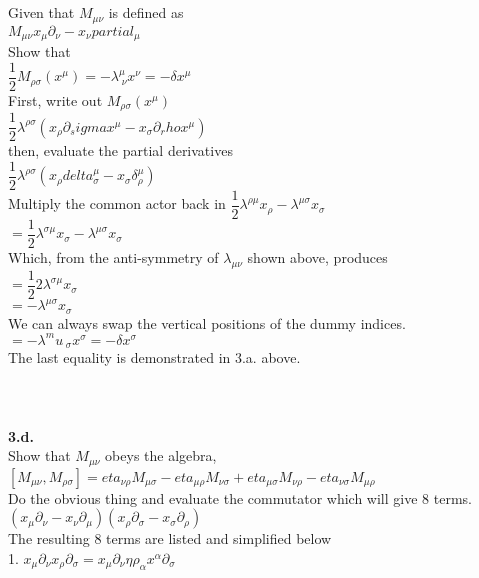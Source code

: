 \documentclass[prb,preprint]
{revtex4-1}
\newcommand{\PRLsep}{\noindent\makebox[\linewidth]{\resizebox{0.8888\linewidth}{2pt}{$\bullet$}}\bigskip}
\begin{document}
\\
\\
Given that $M_{\mu\nu}$ is defined as 
\\
$M_{\mu\nu} x_\mu\partial_\nu - x_\nu partial_\mu$
\\
Show that 
\\
$\dfrac{1}{2} M_{\rho\sigma}\left(x^\mu\right) = -\lambda^\mu_{\;\nu} x^\nu = -\delta x^\mu$
\\
First, write out $M_{\rho\sigma}\left(x^\mu\right)$
\\
$\dfrac{1}{2}\lambda^{\rho\sigma}\left(x_\rho \partial_sigma x^\mu - x_\sigma \partial_rho x^\mu\right)$
\\
then, evaluate the partial derivatives
\\
$\dfrac{1}{2}\lambda^{\rho\sigma}\left(x_\rho delta^\mu_\sigma - x_\sigma \delta^\mu_\rho\right)$
\\
Multiply the common actor back in
$\dfrac{1}{2}\lambda^{\rho\mu} x_\rho - \lambda^{\mu\sigma} x_\sigma$
\\
$= \dfrac{1}{2}\lambda^{\sigma\mu}x_\sigma - \lambda^{\mu\sigma}x_\sigma$
\\
Which, from the anti-symmetry of $\lambda_{\mu\nu}$ shown above, produces
\\
$=\dfrac{1}{2}2\lambda^{\sigma\mu} x_\sigma$
\\
$=-\lambda^{\mu\sigma} x_\sigma$
\\
We can always swap the vertical positions of the dummy indices.
\\
$=-\lambda^mu_{\;\sigma} x^\sigma = -\delta x^\sigma$
\\
The last equality is demonstrated in 3.a. above.
\\
\\
\PRLsep
\\
\\
\newpage
\textbf{3.d.}
\\
Show that $M_{\mu\nu}$ obeys the algebra, 
$\left[M_{\mu\nu}, M_{\rho\sigma}\right] = eta_{\nu\rho}M_{\mu\sigma} - eta_{\mu\rho}M_{\nu\sigma} + eta_{\mu\sigma}M_{\nu\rho} - eta_{\nu\sigma}M_{\mu\rho}$
\\
Do the obvious thing and evaluate the commutator which will give 8 terms.
\\
$\left(x_\mu \partial_\nu - x_\nu \partial_\mu\right)\left(x_\rho \partial_\sigma - x_\sigma \partial_\rho\right)$
\\
The resulting 8 terms are listed and simplified below
\\
1.  $x_\mu \partial_\nu x_\rho \partial_\sigma = x_\mu\partial_\nu\eta{\rho_\alpha}x^\alpha \partial_\sigma$
\end{document}
